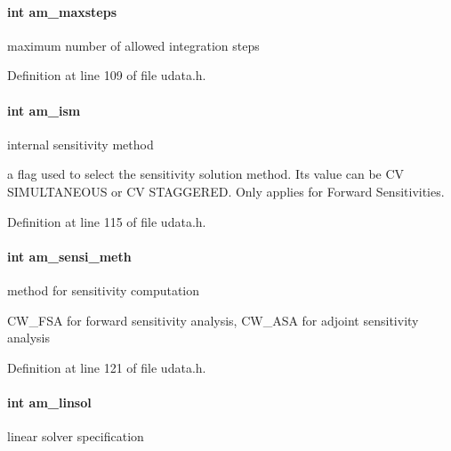 \paragraph[{am\+\_\+maxsteps}]{\setlength{\rightskip}{0pt plus 5cm}int am\+\_\+maxsteps}\label{struct_user_data_a0187950731c16f2857d0cd5b92416352}
maximum number of allowed integration steps 

Definition at line 109 of file udata.\+h.

\hypertarget{struct_user_data_a1f2514c0ee00da61ade386173b718a02}{}
\paragraph[{am\+\_\+ism}]{\setlength{\rightskip}{0pt plus 5cm}int am\+\_\+ism}\label{struct_user_data_a1f2514c0ee00da61ade386173b718a02}
internal sensitivity method

a flag used to select the sensitivity solution method. Its value can be C\+V S\+I\+M\+U\+L\+T\+A\+N\+E\+O\+U\+S or C\+V S\+T\+A\+G\+G\+E\+R\+E\+D. Only applies for Forward Sensitivities. 

Definition at line 115 of file udata.\+h.

\hypertarget{struct_user_data_a83bc6716ecf3decb3d963929361fcd6d}{}
\paragraph[{am\+\_\+sensi\+\_\+meth}]{\setlength{\rightskip}{0pt plus 5cm}int am\+\_\+sensi\+\_\+meth}\label{struct_user_data_a83bc6716ecf3decb3d963929361fcd6d}
method for sensitivity computation

C\+W\+\_\+\+F\+S\+A for forward sensitivity analysis, C\+W\+\_\+\+A\+S\+A for adjoint sensitivity analysis 

Definition at line 121 of file udata.\+h.

\hypertarget{struct_user_data_a03fa52449ab4bb9a1a75312fd9064db1}{}
\paragraph[{am\+\_\+linsol}]{\setlength{\rightskip}{0pt plus 5cm}int am\+\_\+linsol}\label{struct_user_data_a03fa52449ab4bb9a1a75312fd9064db1}
linear solver specification 


